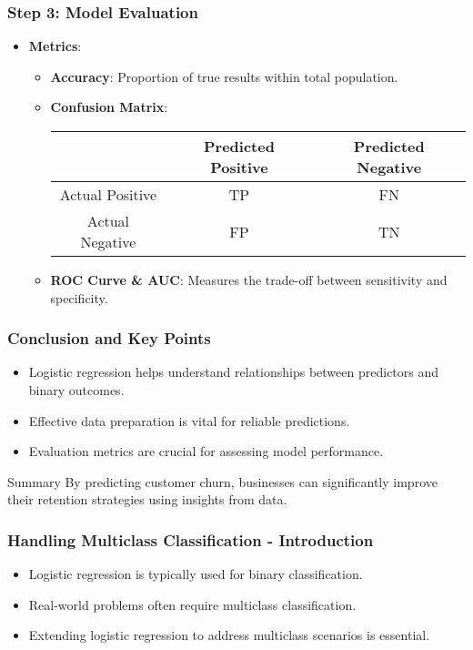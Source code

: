 \documentclass[aspectratio=169]{beamer}
\begin{document}
\begin{frame}
    \frametitle{Step 3: Model Evaluation}
    \begin{itemize}
        \item \textbf{Metrics}:
        \begin{itemize}
            \item \textbf{Accuracy}: Proportion of true results within total population.
            \item \textbf{Confusion Matrix}: 
            \begin{center}
            \begin{tabular}{|c|c|c|}
                \hline
                & Predicted Positive & Predicted Negative \\
                \hline
                Actual Positive & TP & FN \\
                \hline
                Actual Negative & FP & TN \\
                \hline
            \end{tabular}
            \end{center}
            \item \textbf{ROC Curve \& AUC}: Measures the trade-off between sensitivity and specificity.
        \end{itemize}
    \end{itemize}
\end{frame}

\begin{frame}
    \frametitle{Conclusion and Key Points}
    \begin{itemize}
        \item Logistic regression helps understand relationships between predictors and binary outcomes.
        \item Effective data preparation is vital for reliable predictions.
        \item Evaluation metrics are crucial for assessing model performance.
    \end{itemize}
    \begin{block}{Summary}
        By predicting customer churn, businesses can significantly improve their retention strategies using insights from data.
    \end{block}
\end{frame}

\begin{frame}[fragile]
    \frametitle{Handling Multiclass Classification - Introduction}
    \begin{itemize}
        \item Logistic regression is typically used for binary classification.
        \item Real-world problems often require multiclass classification.
        \item Extending logistic regression to address multiclass scenarios is essential.
    \end{itemize}
\end{frame}
\end{document}
